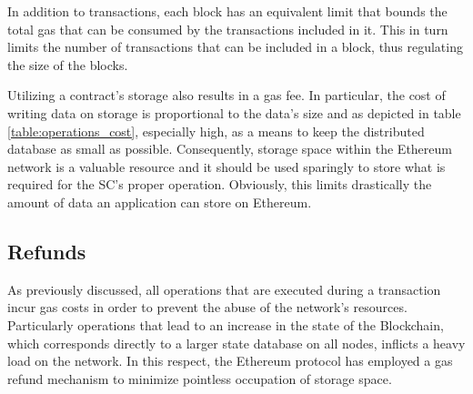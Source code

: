 In addition to transactions, each block has an equivalent limit that bounds the total gas that can be consumed by the transactions included in it. This in turn limits the number of transactions that can be included in a block, thus regulating the size of the blocks.

Utilizing a contract’s storage also results in a gas fee. In particular, the cost of writing data on storage is proportional to the data’s size and as depicted in table \ref{table:operations_cost}, especially high, as a means to keep the distributed database as small as possible. Consequently, storage space within the Ethereum network is a valuable resource and it should be used sparingly to store what is required for the SC's proper operation. Obviously, this limits drastically the amount of data an application can store on Ethereum.

\subsection{Refunds}\label{sec:gas}
As previously discussed, all operations that are executed during a transaction incur gas costs in order to prevent the abuse of the network's resources. Particularly operations that lead to an increase in the state of the Blockchain, which corresponds directly to a larger state database on all nodes, inflicts a heavy load on the network. In this respect, the Ethereum protocol has employed a gas refund mechanism to minimize pointless occupation of storage space.

